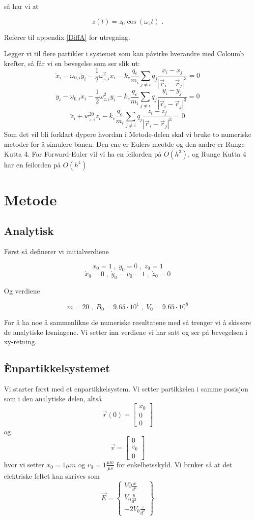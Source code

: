 \documentclass[reprint,english,notitlepage, nofootinbib]{revtex4-1}  %
\begin{document}
så har vi at

$$z(t) = z_0 \cos{(\omega_zt)} \; .$$

Referer til appendix \ref{DiffA} for utregning.

Legger vi til flere partikler i systemet som kan påvirke hverandre med Coloumb krefter, så får vi en bevegelse som ser slik ut:
$$
\ddot{x}_i -\omega_{0,i} \ddot{y}_i-\frac{1}{2}\omega_{z,i}^2x_i-k_e\frac{q_e}{m_i}\sum_{j\neq i}q_j\frac{x_i-x_j}{|\vec{r}_i-\vec{r}_j|^3}=0
$$
$$
\ddot{y}_i -\omega_{0,i} \ddot{x}_i-\frac{1}{2}\omega_{z,i}^2y_i-k_e\frac{q_e}{m_i}\sum_{j\neq i}q_j\frac{y_i-y_j}{|\vec{r}_i-\vec{r}_j|^3}=0
$$
$$
\ddot{z}_i+w_{z,i}^20z_i-k_e\frac{q_e}{m_i}\sum_{j\neq i}q_j\frac{z_i-z_j}{|\vec{r}_i-\vec{r}_j|^3}=0
$$
Som det vil bli forklart dypere hvordan i Metode-delen skal vi bruke to numeriske metoder for å simulere banen. Den ene er Eulers meotde og den andre er Runge Kutta 4. For Forward-Euler vil vi ha en feilorden på $O(h^3)$, og Runge Kutta 4 har en feilorden på $O(h^4)$


\section{Metode}

\subsection*{Analytisk}

Først så definerer vi initialverdiene

$$ x_0 = 1 \; , \; y_0 = 0 \; , \; z_0 = 1$$
$$ \dot{x}_0 = 0 \; , \; \dot{y}_0 = v_0 = 1 \; , \; \dot{z}_0 = 0$$

Og verdiene

$$ m = 20 \; , \; B_0 = 9.65 \cdot 10^1 \; , \; V_0 = 9.65 \cdot 10^8 $$

For å ha noe å sammenlikne de numeriske resultatene med så trenger vi å skissere de analytiske løsningene. Vi setter inn verdiene vi har satt og ser på bevegelsen i xy-retning. 

\subsection*{Ènpartikkelsystemet}
Vi starter først med et enpartikkelsystem. Vi setter partikkelen i samme posisjon som i den analytiske delen, altså
$$
\vec{r}(0)=\begin{bmatrix}
x_0 \\ 0 \\0
\end{bmatrix}
$$
og
$$
\vec{v}=\begin{bmatrix}
0\\v_0\\0
\end{bmatrix}
$$
hvor vi setter $x_0=1\mu m$ og $v_0=1\frac{\mu m}{\mu s}$ for enkelhetsskyld. Vi bruker så at det elektriske feltet kan skrives som
$$
\vec{E}=\begin{Bmatrix}
V0\frac{x}{d^2} \\V_0 \frac{y}{d^2}\\-2V_0 \frac{z}{d^2}
\end{Bmatrix}
$$
\end{document}
